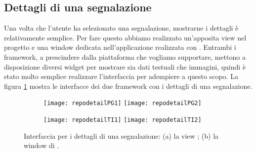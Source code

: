         \subsection{Dettagli di una segnalazione}
        \label{subsec:dettagli}
            Una volta che l'utente ha selezionato una segnalazione, mostrarne i
            dettagli è relativamente semplice. Per fare questo abbiamo
            realizzato un'apposita view \kendomob{} nel progetto \pg{} e una
            window dedicata nell'applicazione realizzata con \tisdk{}. Entrambi
            i framework, a prescindere dalla piattaforma che vogliamo
            supportare, mettono a disposizione diversi widget per mostrare sia
            dati testuali che immagini, quindi è stato molto semplice realizzare
            l'interfaccia per adempiere a questo scopo. La figura
            \ref{fig:repodetails} mostra le interfacce dei due framework con i
            dettagli di una segnalazione.
            \begin{figure}[h]
                \centering
                \begin{subfigure}[b]{0.9\textwidth}
                    \texttt{[image: repodetailPG1]}
                    \texttt{[image: repodetailPG2]}
                    \caption{}
                \end{subfigure}
                \begin{subfigure}[b]{0.9\textwidth}
                    \texttt{[image: repodetailTI1]}
                    \texttt{[image: repodetailTI2]}
                    \caption{}
                \end{subfigure}
                \caption{
                    Interfaccia per i dettagli di una segnalazione: (a) la view
                    \kendomob{}; (b) la window di \tisdk{}.
                }
                \label{fig:repodetails}
            \end{figure}


